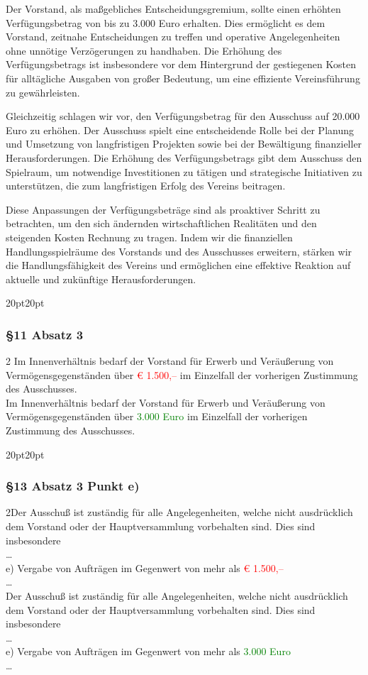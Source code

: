 \documentclass[10pt,a4paper,parskip=half]{scrartcl}
\newcommand{\new}[1]{\textcolor{Green}{#1}}
\newcommand{\old}[1]{\textcolor{Red}{#1}}
\newcommand{\change}[1]{
  \begin{adjustwidth}{20pt}{20pt}
    #1
  \end{adjustwidth}
}
\newcommand{\compare}[3]{\change{\subsubsection*{#1}\begin{multicols}{2}#2\columnbreak\\#3\end{multicols}}}
\begin{document}
  Der Vorstand, als maßgebliches Entscheidungsgremium, sollte einen erhöhten Verfügungsbetrag von bis zu 3.000 Euro erhalten. Dies ermöglicht es dem Vorstand, zeitnahe Entscheidungen zu treffen und operative Angelegenheiten ohne unnötige Verzögerungen zu handhaben. Die Erhöhung des Verfügungsbetrags ist insbesondere vor dem Hintergrund der gestiegenen Kosten für alltägliche Ausgaben von großer Bedeutung, um eine effiziente Vereinsführung zu gewährleisten.
  
  Gleichzeitig schlagen wir vor, den Verfügungsbetrag für den Ausschuss auf 20.000 Euro zu erhöhen. Der Ausschuss spielt eine entscheidende Rolle bei der Planung und Umsetzung von langfristigen Projekten sowie bei der Bewältigung finanzieller Herausforderungen. Die Erhöhung des Verfügungsbetrags gibt dem Ausschuss den Spielraum, um notwendige Investitionen zu tätigen und strategische Initiativen zu unterstützen, die zum langfristigen Erfolg des Vereins beitragen.
  
  Diese Anpassungen der Verfügungsbeträge sind als proaktiver Schritt zu betrachten, um den sich ändernden wirtschaftlichen Realitäten und den steigenden Kosten Rechnung zu tragen. Indem wir die finanziellen Handlungsspielräume des Vorstands und des Ausschusses erweitern, stärken wir die Handlungsfähigkeit des Vereins und ermöglichen eine effektive Reaktion auf aktuelle und zukünftige Herausforderungen.

  \compare{§11 Absatz 3}{
    Im Innenverhältnis bedarf der Vorstand für Erwerb und Veräußerung von Vermögensgegenständen über \old{€ 1.500,--} im Einzelfall der vorherigen Zustimmung des Ausschusses.
  }{Im Innenverhältnis bedarf der Vorstand für Erwerb und Veräußerung von Vermögensgegenständen über \new{3.000 Euro} im Einzelfall der vorherigen Zustimmung des Ausschusses.}

  \compare{§13 Absatz 3 Punkt e)}
  {Der Ausschuß ist zuständig für alle Angelegenheiten, welche nicht ausdrücklich dem
    Vorstand oder der Hauptversammlung vorbehalten sind. Dies sind insbesondere\\\dots\\
  e) Vergabe von Aufträgen im Gegenwert von mehr als \old{€ 1.500,--}\\\dots}
  {Der Ausschuß ist zuständig für alle Angelegenheiten, welche nicht ausdrücklich dem
    Vorstand oder der Hauptversammlung vorbehalten sind. Dies sind insbesondere\\\dots\\
    e) Vergabe von Aufträgen im Gegenwert von mehr als \new{3.000 Euro}\\\dots}
\end{document}
